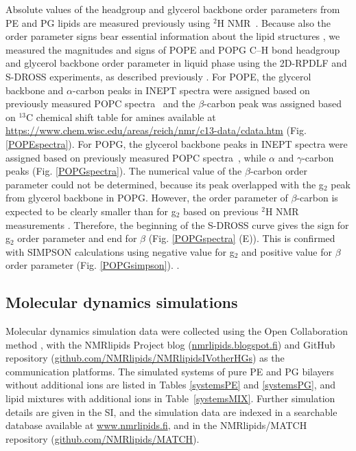 \documentclass[aps,prl,superscriptaddress,twocolumn]{revtex4}
\begin{document}
Absolute values of the headgroup and glycerol backbone order parameters from PE and PG lipids are measured
previously using $^2$H NMR~\cite{seelig76,gally81,wohlgemuth80,borle85}. Because also the order parameter
signs bear essential information about the lipid structures \cite{botan15,ollila16}, we measured the
magnitudes and signs of POPE and POPG C--H bond headgroup and glycerol backbone order parameter in liquid phase
using the 2D-RPDLF and S-DROSS experiments, as described previously \cite{ferreira13,ferreira16,antila19}.
For POPE, the glycerol backbone and $\alpha$-carbon peaks in INEPT spectra were assigned based on
previously measured POPC spectra~\cite{ferreira13} and
the $\beta$-carbon peak was assigned based on $^{13}$C chemical shift table for amines available
at \url{https://www.chem.wisc.edu/areas/reich/nmr/c13-data/cdata.htm} (Fig. \ref{POPEspectra}).
For POPG, the glycerol backbone peaks in INEPT spectra were assigned based on
previously measured POPC spectra~\cite{ferreira13}, while $\alpha$ and  $\gamma$-carbon peaks
 (Fig. \ref{POPGspectra}). The numerical value of the $\beta$-carbon
order parameter could not be determined, because its peak overlapped with the g$_2$ peak from glycerol backbone in POPG.
However, the order parameter of $\beta$-carbon is expected to be clearly smaller than for g$_2$
based on previous $^2$H NMR measurements \cite{wohlgemuth80,gally81,borle85}.
Therefore, the beginning of the S-DROSS curve gives the sign for g$_2$ order parameter and end for $\beta$ (Fig. \ref{POPGspectra} (E)).
This is confirmed with SIMPSON calculations using negative value for g$_2$ and positive value for $\beta$ order parameter (Fig. \ref{POPGsimpson}).
.

\subsection{Molecular dynamics simulations}

Molecular dynamics simulation data were collected using
the Open Collaboration method \cite{botan15}, with
the NMR\-lipids Project blog (\url{nmrlipids.blogspot.fi}) and
GitHub repository (\url{github.com/NMRlipids/NMRlipidsIVotherHGs})
as the communication platforms.
The simulated systems of pure PE and PG bilayers without additional ions
are listed in Tables \ref{systemsPE} and \ref{systemsPG},
and lipid mixtures with additional ions in Table~\ref{systemsMIX}.
Further simulation details are given in the SI, and
the simulation data are indexed in a
searchable database available at \url{www.nmrlipids.fi},
and in the NMRlipids/MATCH repository (\url{github.com/NMRlipids/MATCH}).
\end{document}

